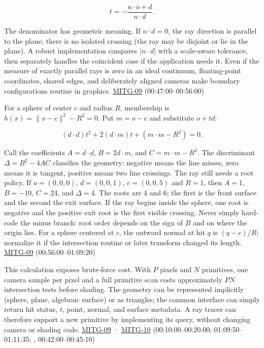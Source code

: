 \[
t=-\frac{n\cdot o+d}{n\cdot d}.
\]

The denominator has geometric meaning. If \(n\cdot d=0\), the ray direction is parallel to the plane; there is no isolated crossing (the ray may be disjoint or lie in the plane). A robust implementation compares \(|n\cdot d|\) with a scale-aware tolerance, then separately handles the coincident case if the application needs it. Even if the measure of exactly parallel rays is zero in an ideal continuum, floating-point coordinates, shared edges, and deliberately aligned cameras make boundary configurations routine in graphics. \hyperref[04-visual-computing-ii-ch036-mitg-09---ray-casting]{MITG-09} (00:47:00--00:56:00)

For a sphere of center \(c\) and radius \(R\), membership is \(h(x)=\|x-c\|^2-R^2=0\). Put \(m=o-c\) and substitute \(o+td\):

\[
(d\cdot d)t^2+2(d\cdot m)t+(m\cdot m-R^2)=0.
\]

Call the coefficients \(A=d\cdot d\), \(B=2d\cdot m\), and \(C=m\cdot m-R^2\). The discriminant \(\Delta=B^2-4AC\) classifies the geometry: negative means the line misses, zero means it is tangent, positive means two line crossings. The ray still needs a root policy. If \(o=(0,0,0)\), \(d=(0,0,1)\), \(c=(0,0,5)\) and \(R=1\), then \(A=1\), \(B=-10\), \(C=24\), and \(\Delta=4\). The roots are \(4\) and \(6\); the first is the front surface and the second the exit surface. If the ray begins inside the sphere, one root is negative and the positive exit root is the first visible crossing. Never simply hard-code the minus branch: root order depends on the sign of \(B\) and on where the origin lies. For a sphere centered at \(c\), the outward normal at hit \(q\) is \((q-c)/R\); normalize it if the intersection routine or later transform changed its length. \hyperref[04-visual-computing-ii-ch036-mitg-09---ray-casting]{MITG-09} (00:56:00--01:09:20)

This calculation exposes brute-force cost. With \(P\) pixels and \(N\) primitives, one camera sample per pixel and a full primitive scan costs approximately \(PN\) intersection tests before shading. The geometry can be represented implicitly (sphere, plane, algebraic surface) or as triangles; the common interface can simply return hit status, \(t\), point, normal, and surface metadata. A ray tracer can therefore support a new primitive by implementing its query, without changing camera or shading code. \hyperref[04-visual-computing-ii-ch036-mitg-09---ray-casting]{MITG-09} · \hyperref[04-visual-computing-ii-ch036-mitg-10---ray-casting-ii]{MITG-10} (00:10:00--00:20:00; 01:09:50--01:11:35; , 00:42:00--00:45:10)

